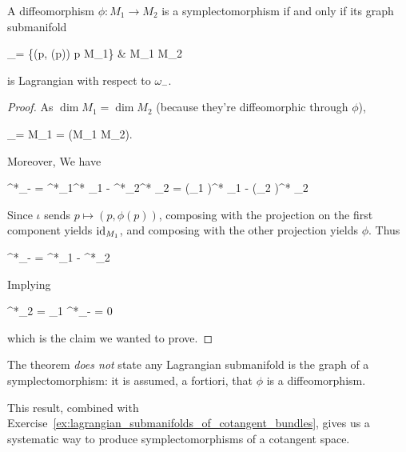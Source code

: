 \documentclass[main.tex]{subfiles}
\begin{document}
\begin{theorem}
\label{th:char_of_symplectomorphism}
	A diffeomorphism $\phi : M_1 \to M_2$ is a symplectomorphism if and only if its graph submanifold
	\begin{diagram}
		\Gamma_\phi = \{(p, \phi(p)) \suchthat p \in M_1\}  \& M_1 \times M_2
	\end{diagram}
	is Lagrangian with respect to $\omega_-$.
\end{theorem}
\begin{proof}
	As $\dim M_1 = \dim M_2$ (because they're diffeomorphic through $\phi$),
	\begin{eqalign}
		\dim \Gamma_\phi = \dim M_1 =  \dim (M_1 \times M_2).
	\end{eqalign}
	Moreover, We have
	\begin{eqalign}
		\iota^*\omega_- = \iota^*\pr_1^* \omega_1 - \iota^*\pr_2^* \omega_2 = (\pr_1 \circ \iota)^* \omega_1 - (\pr_2 \circ \iota)^* \omega_2
	\end{eqalign}
	Since $\iota$ sends $p \mapsto (p,\phi(p))$, composing with the projection on the first component yields $\mathrm{id}_{M_1}$, and composing with the other projection yields $\phi$. Thus
	\begin{eqalign}
		\iota^*\omega_- = \id^*\omega_1 - \phi^*\omega_2
	\end{eqalign}
	Implying
	\begin{eqalign}
		\phi^*\omega_2 = \omega_1 \iff \iota^*\omega_- = 0
	\end{eqalign}
	which is the claim we wanted to prove.
\end{proof}

\begin{remark}
	The theorem \emph{does not} state any Lagrangian submanifold is the graph of a symplectomorphism: it is assumed, a fortiori, that $\phi$ is a diffeomorphism.
\end{remark}

This result, combined with Exercise~\ref{ex:lagrangian_submanifolds_of_cotangent_bundles}, gives us a systematic way to produce symplectomorphisms of a cotangent space.
\end{document}
